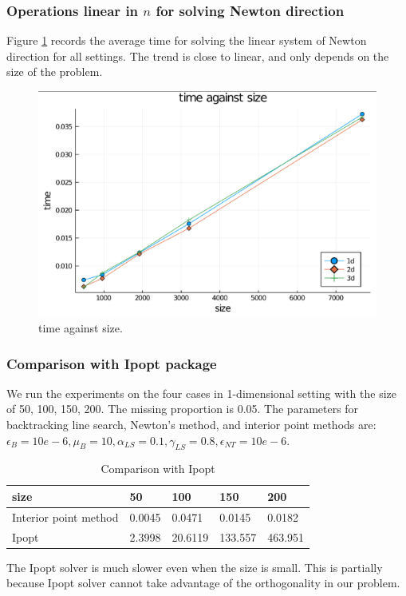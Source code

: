 \documentclass[final,onefignum,onetabnum]{siamart190516}
\newcounter{example}
\begin{document}
\subsubsection{Operations linear in $n$ for solving Newton direction}
Figure \ref{fig:1} records the average time for solving the linear system of Newton direction for all settings. The trend is close to linear, and only depends on the size of the problem.
\begin{figure}[H]
  \centering
  \includegraphics{lineartime.PNG}
  \caption{time against size.}
  \label{fig:1}
\end{figure}
\subsubsection{Comparison with Ipopt package}
\begin{table}[H]
\caption{Comparison with Ipopt}
We run the experiments on the four cases in 1-dimensional setting with the size of 50, 100, 150, 200. The missing proportion is 0.05. The parameters for backtracking line search, Newton's method, and interior point methods are: $\epsilon_B = 10e-6, \mu_B = 10, \alpha_{LS} = 0.1, \gamma_{LS} = 0.8, \epsilon_{NT} = 10e-6.$
\begin{tabular}{|l|l|l|l|l|}
\hline
size                  & 50     & 100     & 150     & 200     \\ \hline
Interior point method & 0.0045 & 0.0471  & 0.0145  & 0.0182  \\ \hline
Ipopt                 & 2.3998 & 20.6119 & 133.557 & 463.951 \\ \hline
\end{tabular}
\end{table}
The Ipopt solver is much slower even when the size is small. This is partially because Ipopt solver cannot take advantage of the orthogonality in our problem.
\end{document}
